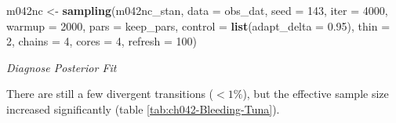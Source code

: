 \documentclass[11pt, oneside, openany]{scrbook}
\newenvironment{Shaded}{\begin{snugshade}}{\end{snugshade}}
\newcommand{\CommentTok}[1]{\textcolor[rgb]{0.56,0.35,0.01}{\textit{#1}}}
\newcommand{\DataTypeTok}[1]{\textcolor[rgb]{0.13,0.29,0.53}{#1}}
\newcommand{\DecValTok}[1]{\textcolor[rgb]{0.00,0.00,0.81}{#1}}
\newcommand{\FloatTok}[1]{\textcolor[rgb]{0.00,0.00,0.81}{#1}}
\newcommand{\KeywordTok}[1]{\textcolor[rgb]{0.13,0.29,0.53}{\textbf{#1}}}
\newcommand{\NormalTok}[1]{#1}
\newcommand{\StringTok}[1]{\textcolor[rgb]{0.31,0.60,0.02}{#1}}
\begin{document}

\begin{Shaded}
\begin{Highlighting}[]
\NormalTok{m042nc <-}\StringTok{ }\KeywordTok{sampling}\NormalTok{(m042nc_stan, }\DataTypeTok{data =}\NormalTok{ obs_dat, }\DataTypeTok{seed =} \DecValTok{143}\NormalTok{,}
                   \DataTypeTok{iter =} \DecValTok{4000}\NormalTok{, }\DataTypeTok{warmup =} \DecValTok{2000}\NormalTok{, }\DataTypeTok{pars =}\NormalTok{ keep_pars,}
                   \DataTypeTok{control =} \KeywordTok{list}\NormalTok{(}\DataTypeTok{adapt_delta =} \FloatTok{0.95}\NormalTok{), }\DataTypeTok{thin =} \DecValTok{2}\NormalTok{,}
                   \DataTypeTok{chains =} \DecValTok{4}\NormalTok{, }\DataTypeTok{cores =} \DecValTok{4}\NormalTok{, }\DataTypeTok{refresh =} \DecValTok{100}\NormalTok{)}
\end{Highlighting}
\end{Shaded}


\emph{Diagnose Posterior Fit}


\begin{Shaded}
\end{Shaded}


There are still a few divergent transitions (\(<1\%\)), but the effective sample size increased significantly (table \ref{tab:ch042-Bleeding-Tuna}).
\end{document}
